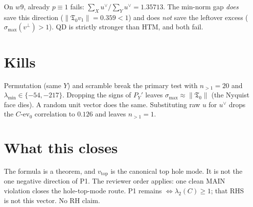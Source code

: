 \documentclass[11pt]{article}
\theoremstyle{remark}
\newcommand{\Tfrak}{\mathfrak{T}}
\begin{document}
On $w9$, already $p\equiv 1$ fails:
$\sum_X u^\vee\big/\sum_Y u^\vee=1.35713$.
The min-norm gap \emph{does} save this direction
($\|\Tfrak_0 v_1\|=0.359<1$) and does \emph{not}
save the leftover excess ($\sigma_{\max}(v^\perp)>1$).
QD is strictly stronger than HTM, and both fail.

\section{Kills}

Permutation (same $Y$) and scramble break the primary
test with $n_{>1}=20$ and $\lambda_{\min}\in\{-54,-217\}$.
Dropping the signs of $P_Y'$ leaves
$\sigma_{\max}\approx\|\Tfrak_0\|$ (the Nyquist face dies).
A random unit vector does the same.
Substituting raw $u$ for $u^\vee$ drops the $C$-ev$_0$
correlation to $0.126$ and leaves $n_{>1}=1$.

\section{What this closes}

The formula is a theorem, and $v_{\mathrm{top}}$ is the
canonical top hole mode.
It is not the one negative direction of P1.
The reviewer order applies: one clean MAIN violation
closes the hole-top-mode route.
P1 remains $\iff\lambda_2(C)\ge 1$; that RHS is not this
vector.
No RH claim.
\end{document}
